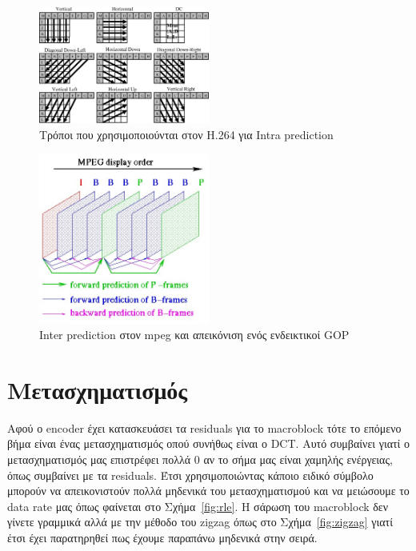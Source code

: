 \begin{figure}[h!]

  \centering
    \includegraphics[width=0.5\textwidth]{chapter2/intrapred.jpg}
  \caption{Τρόποι που χρησιμοποιούνται στον Η.264 για Intra prediction}
    \label{fig:intrapred}
\end{figure}

\begin{figure}[h!]

  \centering
    \includegraphics[width=0.5\textwidth]{chapter2/gop.jpg}
  \caption{Inter prediction στον mpeg και απεικόνιση ενός ενδεικτικοί GOP }
  \label{fig:gop}
\end{figure}

\newpage
\section{Μετασχηματισμός}
\label{section:sect24}

\indent Αφού ο encoder έχει κατασκευάσει τα residuals για το macroblock τότε το επόμενο βήμα είναι ένας μετασχηματισμός οπού συνήθως είναι ο DCT. Αυτό συμβαίνει γιατί ο μετασχηματισμός μας επιστρέφει πολλά 0 αν το σήμα μας είναι χαμηλής ενέργειας, όπως συμβαίνει με τα residuals. Έτσι χρησιμοποιώντας κάποιο ειδικό σύμβολο μπορούν να απεικονιστούν πολλά μηδενικά του μετασχηματισμού και να μειώσουμε το data rate μας όπως φαίνεται στο Σχήμα~\ref{fig:rle}. Η σάρωση του macroblock δεν γίνετε γραμμικά αλλά με την μέθοδο του zigzag όπως στο Σχήμα~\ref{fig:zigzag} γιατί έτσι έχει παρατηρηθεί πως έχουμε παραπάνω μηδενικά στην σειρά.

